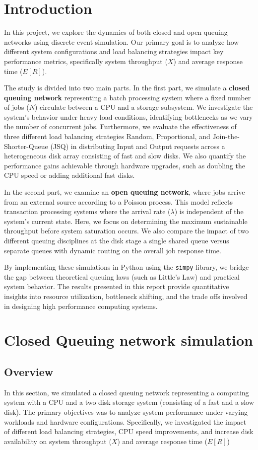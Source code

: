 \documentclass[a4paper,10pt]{article}
\begin{document}
\newpage
\section{Introduction}
In this project, we explore the dynamics of both closed and open queuing networks using discrete event simulation. Our primary goal is to analyze how different system configurations and load balancing strategies impact key performance metrics, specifically system throughput ($X$) and average response time ($E[R]$).

The study is divided into two main parts. In the first part, we simulate a \textbf{closed queuing network} representing a batch processing system where a fixed number of jobs ($N$) circulate between a CPU and a storage subsystem. We investigate the system's behavior under heavy load conditions, identifying bottlenecks as we vary the number of concurrent jobs. Furthermore, we evaluate the effectiveness of three different load balancing strategies Random, Proportional, and Join-the-Shorter-Queue (JSQ) in distributing Input and Output requests across a heterogeneous disk array consisting of fast and slow disks. We also quantify the performance gains achievable through hardware upgrades, such as doubling the CPU speed or adding additional fast disks.

In the second part, we examine an \textbf{open queuing network}, where jobs arrive from an external source according to a Poisson process. This model reflects transaction processing systems where the arrival rate ($\lambda$) is independent of the system's current state. Here, we focus on determining the maximum sustainable throughput before system saturation occurs. We also compare the impact of two different queuing disciplines at the disk stage a single shared queue versus separate queues with dynamic routing on the overall job response time.

By implementing these simulations in Python using the \texttt{simpy} library, we bridge the gap between theoretical queuing laws (such as Little's Law) and practical system behavior. The results presented in this report provide quantitative insights into resource utilization, bottleneck shifting, and the trade offs involved in designing high performance computing systems.\cite{chen2025simulation}

\section{Closed Queuing network simulation}
\subsection{Overview}
In this section, we simulated a closed queuing network representing a computing system with a CPU and a two disk storage system (consisting of a fast and a slow disk). The primary objectives was to analyze system performance under varying workloads and hardware configurations. Specifically, we investigated the impact of different load balancing strategies, CPU speed improvements, and increase disk availability on system throughput ($X$) and average response time ($E[R]$)
\end{document}
